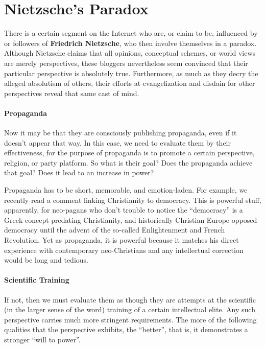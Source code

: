 \section{Nietzsche’s Paradox}

There is a certain segment on the Internet who are, or claim to be, influenced by or followers of \textbf{Friedrich Nietzsche}, who then involve themselves in a paradox. Although Nietzsche claims that all opinions, conceptual schemes, or world views are merely perspectives, these bloggers nevertheless seem convinced that their particular perspective is absolutely true. Furthermore, as much as they decry the alleged absolutism of others, their efforts at evangelization and disdain for other perspectives reveal that same cast of mind.

\paragraph{Propaganda}


Now it may be that they are consciously publishing propaganda, even if it doesn't appear that way. In this case, we need to evaluate them by their effectiveness, for the purpose of propaganda is to promote a certain perspective, religion, or party platform. So what is their goal? Does the propaganda achieve that goal? Does it lead to an increase in power?

Propaganda has to be short, memorable, and emotion-laden. For example, we recently read a comment linking Christianity to democracy. This is powerful stuff, apparently, for neo-pagans who don't trouble to notice the ``democracy'' is a Greek concept predating Christianity, and historically Christian Europe opposed democracy until the advent of the so-called Enlightenment and French Revolution. Yet as propaganda, it is powerful because it matches his direct experience with contemporary neo-Christians and any intellectual correction would be long and tedious.

\paragraph{Scientific Training}


If not, then we must evaluate them as though they are attempts at the scientific (in the larger sense of the word) training of a certain intellectual elite. Any such perspective carries much more stringent requirements. The more of the following qualities that the perspective exhibits, the ``better'', that is, it demonstrates a stronger ``will to power''.


